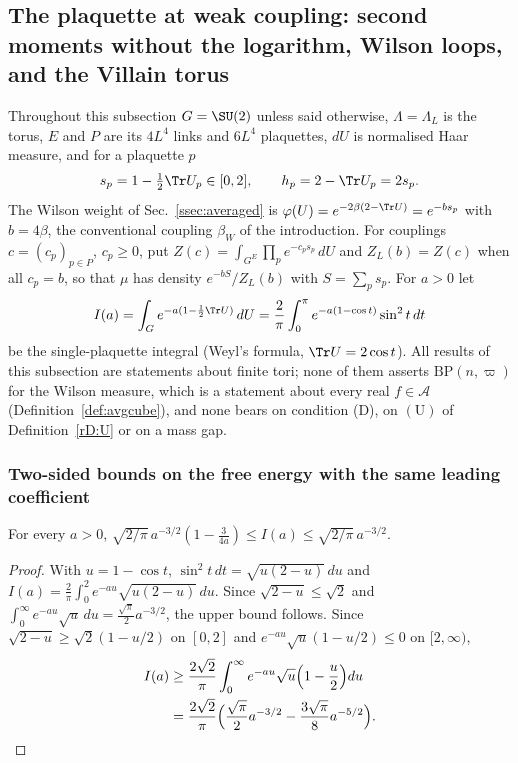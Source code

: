 
\subsection{The plaquette at weak coupling: second moments without the
logarithm, Wilson loops, and the Villain torus}\label{rDtwo:sec}

Throughout this subsection $G=\SU(2)$ unless said otherwise, $\Lambda=
\Lambda_L$ is the torus, $E$ and $P$ are its $4L^4$ links and $6L^4$
plaquettes, $dU$ is normalised Haar measure, and for a plaquette $p$
\[
s_p=1-\tfrac12\Tr U_p\in[0,2],\qquad h_p=2-\Tr U_p=2s_p .
\]
The Wilson weight of Sec.~\ref{ssec:averaged} is $\varphi(U)=e^{-2\beta
(2-\Tr U)}=e^{-bs_p}$ with $b=4\beta$, the conventional coupling $\beta_W$ of the
introduction. For couplings $c=(c_p)_{p\in P}$, $c_p\ge0$, put
$Z(c)=\int_{G^E}\prod_pe^{-c_ps_p}\,dU$ and $Z_L(b)=Z(c)$ when all $c_p=b$,
so that $\mu$ has density $e^{-bS}/Z_L(b)$ with $S=\sum_ps_p$. For $a>0$ let
\[
I(a)=\int_Ge^{-a(1-\frac12\Tr U)}\,dU=\frac2\pi\int_0^\pi e^{-a(1-\cos t)}
\sin^2t\,dt
\]
be the single-plaquette integral (Weyl's formula, $\Tr U=2\cos t$). All
results of this subsection are statements about finite tori; none of them
asserts $\mathrm{BP}(n,\varpi)$ for the Wilson measure, which is a
statement about every real $f\in\mathcal A$ (Definition~\ref{def:avgcube}),
and none bears on condition (D), on $(\mathrm U)$ of
Definition~\ref{rD:U} or on a mass gap.

\subsubsection{Two-sided bounds on the free energy with the same leading
coefficient}

\begin{lemma}\label{rDtwo:I}
For every $a>0$,
$\sqrt{2/\pi}\,a^{-3/2}(1-\frac3{4a})\le I(a)\le\sqrt{2/\pi}\,a^{-3/2}$.
\end{lemma}

\begin{proof}
With $u=1-\cos t$, $\sin^2t\,dt=\sqrt{u(2-u)}\,du$ and $I(a)=\frac2\pi
\int_0^2e^{-au}\sqrt{u(2-u)}\,du$. Since $\sqrt{2-u}\le\sqrt2$ and
$\int_0^\infty e^{-au}\sqrt u\,du=\frac{\sqrt\pi}2a^{-3/2}$, the upper bound
follows. Since $\sqrt{2-u}\ge\sqrt2(1-u/2)$ on $[0,2]$ and $e^{-au}\sqrt u
(1-u/2)\le0$ on $[2,\infty)$,
\[
\begin{split}
I(a)&\ge\frac{2\sqrt2}\pi\int_0^\infty e^{-au}\sqrt u\Bigl(1-\frac u2\Bigr)du\\
&=\frac{2\sqrt2}\pi\Bigl(\frac{\sqrt\pi}2a^{-3/2}-\frac{3\sqrt\pi}8a^{-5/2}
\Bigr).\qedhere
\end{split}
\]
\end{proof}

